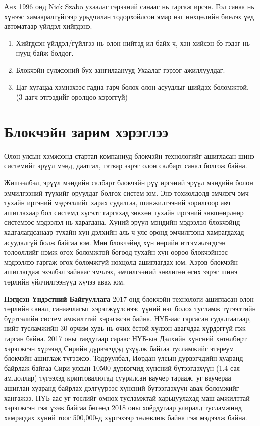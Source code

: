 Анх 1996 онд Nick Szabo  ухаалаг гэрээний санааг нь гаргаж ирсэн. Гол санаа нь хүнээс хамааралгүйгээр урьдчилан тодорхойлсон ямар нэг нөхцөлийн биелэх үед автоматаар үйлдэл хийгдэнэ.

\begin{enumerate}
   \item  Хийгдсэн үйлдэл/гүйлгээ нь олон нийтэд ил байх ч, хэн хийсэн бэ гэдэг нь нууц байж болдог.
   \item  Блокчэйн сүлжээний бүх зангилаанууд Ухаалаг гэрээг ажиллуулдаг.
   \item Цаг хугацаа хэмнэхээс гадна гарч болох олон асуудлыг шийдэх боломжтой. (3-дагч этгээдийг оролцоо хэрэггүй)
\end{enumerate}

\section{Блокчэйн зарим хэрэглээ}
Олон улсын хэмжээнд стартап компаниуд блокчэйн технологийг
ашигласан шинэ системийг эрүүл мэнд, даатгал, татвар зэрэг олон салбарт санал болгож байна.

Жишээлбэл, эрүүл мэндийн салбарт блокчэйн рүү иргэний эрүүл
мэндийн болон эмчилгээний түүхийг оруулдаг болгох систем юм. Энэ
тохиолдолд эмчлэгч эмч тухайн иргэний мэдээллийг харах судалгаа, шинжилгээний зорилгоор авч ашиглахаар бол системд хүсэлт гаргахад зөвхөн тухайн иргэний зөвшөөрлөөр системээс мэдээлэл нь харагдана. Хүний эрүүл мэндийн мэдээлэл блокчэйнд хадгалагдсанаар тухайн хүн дэлхийн аль ч улс оронд эмчилгээнд хамрагдахад асуудалгүй болж байгаа юм. Мөн блокчэйнд хүн өөрийн итгэмжлэгдсэн төлөөллийг нэмж өгөх боломжтой бөгөөд тухайн хүн өөрөө блокчэйнээс мэдээллээ гаргаж өгөх боломжгүй нөхцөлд ашиглагдах юм. Хэрэв блокчэйн ашиглагдаж эхэлбэл зайнаас эмчлэх, эмчилгээний зөвлөгөө өгөх зэрэг шинэ төрлийн үйлчилгээнүүд хүчээ авах юм.

\textbf{Нэгдсэн Үндэстний Байгууллага} 2017 онд блокчэйн технологи
ашигласан олон төрлийн санал, санаачлагыг хэрэгжүүлснээс үүний нэг болох тусламж түгээлтийн бүртгэлийн систем амжилттай хэрэгжсэн байна. НҮБ-аас гаргасан судалгаагаар, нийт тусламжийн 30 орчим хувь нь очих ёстой хүлээн авагчдаа хүрдэггүй гэж гарсан байна. 2017 оны тавдугаар сараас НҮБ-ын Дэлхийн хүнсний хөтөлбөрт хэрэгжсэн хүрээнд Сирийн дүрвэгчдэд үзүүлж байгаа тусламжийг этереум блокчэйн ашиглаж түгээжээ. Тодруулбал,
Иордан улсын дүрвэгчдийн хуаранд байрлаж байгаа Сири улсын 10500
дүрвэгчид хүнсний бүтээгдэхүүн (1.4 сая ам.доллар) түгээхэд криптовалютад суурилсан ваучер тарааж, уг ваучераа ашиглан хуаранд байрлах дэлгүүрээс хүнсний бүтээгдэхүүн авах боломжийг хангажээ. НҮБ-аас уг төслийг өмнөх тусламжтай харьцуулахад маш амжилттай хэрэгжсэн гэж үзэж байгаа бөгөөд 2018 оны хоёрдугаар улиралд тусламжинд хамрагдах хүний тоог 500,000-д хүргэхээр төлөвлөж байна гэж мэдээлж байна.

